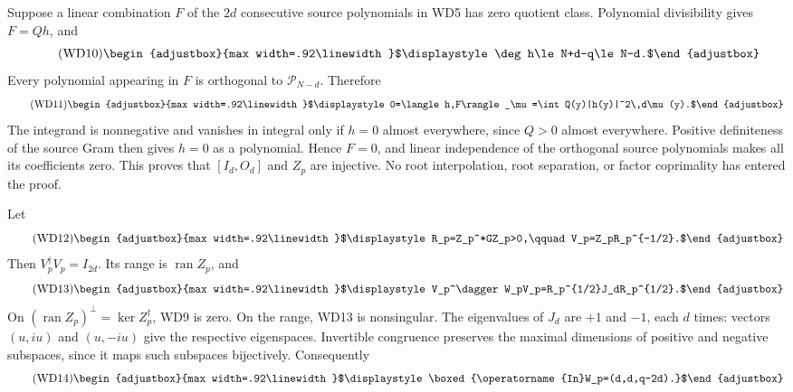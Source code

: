 \documentclass[11pt]{article}
\begin{document}
Suppose a linear combination \(F\) of the \(2d\) consecutive source polynomials in WD5 has zero quotient class. Polynomial divisibility gives \(F=Qh\), and 
\begin{equation*}
\tag{WD10}
\begin{adjustbox}{max width=.92\linewidth}$\displaystyle \deg h\le N+d-q\le N-d.$\end{adjustbox}
\end{equation*}
 Every polynomial appearing in \(F\) is orthogonal to \(\mathcal P_{N-d}\). Therefore 
\begin{equation*}
\tag{WD11}
\begin{adjustbox}{max width=.92\linewidth}$\displaystyle 0=\langle h,F\rangle_\mu=\int Q(y)|h(y)|^2\,d\mu(y).$\end{adjustbox}
\end{equation*}
 The integrand is nonnegative and vanishes in integral only if \(h=0\) almost everywhere, since \(Q>0\) almost everywhere. Positive definiteness of the source Gram then gives \(h=0\) as a polynomial. Hence \(F=0\), and linear independence of the orthogonal source polynomials makes all its coefficients zero. This proves that \([I_d,O_d]\) and \(Z_p\) are injective. No root interpolation, root separation, or factor coprimality has entered the proof.

Let 
\begin{equation*}
\tag{WD12}
\begin{adjustbox}{max width=.92\linewidth}$\displaystyle R_p=Z_p^*GZ_p>0,\qquad V_p=Z_pR_p^{-1/2}.$\end{adjustbox}
\end{equation*}
 Then \(V_p^\dagger V_p=I_{2d}\). Its range is \(\operatorname{ran}Z_p\), and 
\begin{equation*}
\tag{WD13}
\begin{adjustbox}{max width=.92\linewidth}$\displaystyle V_p^\dagger W_pV_p=R_p^{1/2}J_dR_p^{1/2}.$\end{adjustbox}
\end{equation*}
 On \((\operatorname{ran}Z_p)^\perp=\ker Z_p^\dagger\), WD9 is zero. On the range, WD13 is nonsingular. The eigenvalues of \(J_d\) are \(+1\) and \(-1\), each \(d\) times: vectors \((u,iu)\) and \((u,-iu)\) give the respective eigenspaces. Invertible congruence preserves the maximal dimensions of positive and negative subspaces, since it maps such subspaces bijectively. Consequently 
\begin{equation*}
\tag{WD14}
\begin{adjustbox}{max width=.92\linewidth}$\displaystyle \boxed{\operatorname{In}W_p=(d,d,q-2d).}$\end{adjustbox}
\end{equation*}
\end{document}
